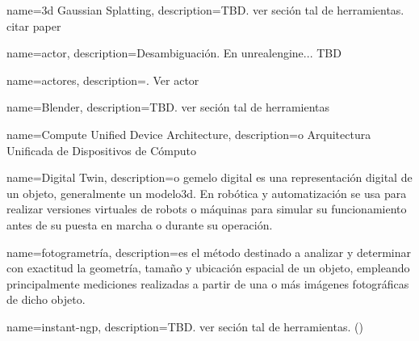 


{
    name={\acrshort{3d} Gaussian Splatting},
    description={TBD. ver seción tal de herramientas. citar paper}
}


{
    name={actor},
    description={Desambiguación. En \gls{unrealengine}... TBD}
}

{
    name={actores},
    description={. Ver \gls{actor}}
}


{
    name={Blender},
    description={TBD. ver seción tal de herramientas}
}


{
    name={Compute Unified Device Architecture},
    description={o Arquitectura Unificada de Dispositivos de Cómputo}
}


{
    name={Digital Twin},
    description={o gemelo digital es una representación digital de un objeto, generalmente un \gls{modelo3d}. En robótica y automatización se usa para realizar versiones virtuales de robots o máquinas para simular su funcionamiento antes de su puesta en marcha o durante su operación.}
}



{
    name={fotogrametría},
    description={es el método destinado a analizar y determinar con exactitud la geometría, tamaño y ubicación espacial de un objeto, empleando principalmente mediciones realizadas a partir de una o más imágenes fotográficas de dicho objeto.}
}




{
    name={instant-ngp},
    description={TBD. ver seción tal de herramientas. (\cite{mueller2022instant})}
}


